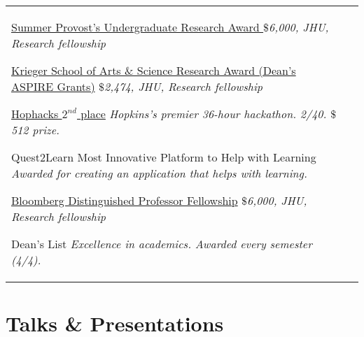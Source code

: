 \documentclass[10pt]{article} %
\begin{document}
\begin{supertabular}{L{4cm}@{\hskip 0.3in}L{13cm}}
{\href{https://hour.jhu.edu/opportunities/summerpura/}{Summer Provost’s Undergraduate Research Award }} %
{\textit{$\$$6,000, JHU, Research fellowship}} %

{\href{https://krieger.jhu.edu/ursca/projects/aspire-grant/}{Krieger School of Arts \& Science Research Award (Dean's ASPIRE Grants)}} %
{\textit{$\$$2,474, JHU, Research fellowship}} %

{\href{https://hophacks.com/}{Hophacks $2^{nd}$ place}} %
{\textit{Hopkins's premier 36-hour hackathon. 2/40. $\$$512 prize.}} %

{Quest2Learn Most Innovative Platform to Help with Learning }
{\textit{Awarded for creating an application that helps with learning.}}


{\href{https://hour.jhu.edu/opportunities/bdpsp/}{Bloomberg Distinguished Professor Fellowship}}
{\textit{$\$$6,000, JHU, Research fellowship}}

{Dean's List}
{\textit{Excellence in academics. Awarded every semester (4/4).}}
\end{supertabular}

	
	



\section{Talks \& Presentations}



\end{document}

